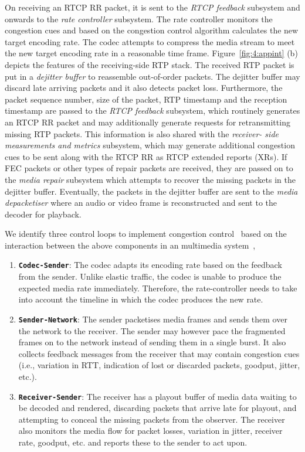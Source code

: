 On receiving an RTCP RR packet, it is sent to the \emph{RTCP feedback}
subsystem and onwards to the \emph{rate controller} subsystem. The rate
controller monitors the congestion cues and based on the congestion control
algorithm calculates the new target encoding rate. The codec attempts to
compress the media stream to meet the new target encoding rate in a reasonable
time frame. Figure~\ref{fig:4:appint} (b) depicts the features of the
receiving-side RTP stack. The received RTP packet is put in a \emph{dejitter
buffer} to reassemble out-of-order packets. The dejitter buffer may discard
late arriving packets and it also detects packet loss. Furthermore, the packet
sequence number, size of the packet, RTP timestamp and the reception timestamp
are passed to the \emph{RTCP feedback} subsystem, which routinely generates an
RTCP RR packet and may additionally generate requests for retransmitting
missing RTP packets. This information is also shared with the \emph{receiver-
side measurements and metrics} subsystem, which may generate additional
congestion cues to be sent along with the RTCP RR as RTCP extended reports
(XRs). If FEC packets or other types of repair packets are received, they are
passed on to the \emph{media repair} subsystem which attempts to recover the
missing packets in the dejitter buffer. Eventually, the packets in the
dejitter buffer are sent to the \emph{media depacketiser} where an audio or
video frame is reconstructed and sent to the decoder for playback.


We identify three control loops to implement congestion
control~\cite{Singh:control.loops.api} based on the interaction between the
above components in an multimedia system~\cite{draft.rmcat.app.interaction},

\begin{enumerate}
\setlength{\itemsep}{0pt}

\item \textbf{\texttt{Codec-Sender}}: The codec adapts its encoding rate based
on the feedback from the sender. Unlike elastic traffic, the codec is unable
to produce the expected media rate immediately. Therefore, the rate-controller
needs to take into account the timeline in which the codec produces the new
rate.

\item \textbf{\texttt{Sender-Network}}: The sender packetises media frames and
sends them over the network to the receiver. The sender may however pace the
fragmented frames on to the network instead of sending them in a single
burst. It also collects feedback messages from the receiver that may contain
congestion cues (i.e., variation in RTT, indication of lost or discarded
packets, goodput, jitter, etc.).

\item \textbf{\texttt{Receiver-Sender}}: The receiver has a playout buffer of
media data waiting to be decoded and rendered, discarding packets that arrive
late for playout, and attempting to conceal the missing packets from the
observer. The receiver also monitors the media flow for packet losses,
variation in jitter, receiver rate, goodput, etc. and reports these to the
sender to act upon.

\end{enumerate}

